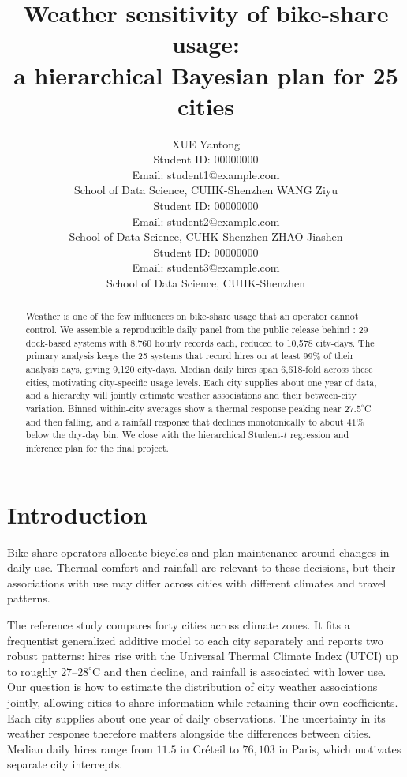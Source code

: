 \documentclass{article}
\title{Weather sensitivity of bike-share usage:\\ a hierarchical Bayesian plan for 25 cities}
\author{%
  XUE Yantong \\
  Student ID: 00000000 \\
  Email: student1@example.com \\
  School of Data Science, CUHK-Shenzhen
  \And
  WANG Ziyu \\
  Student ID: 00000000 \\
  Email: student2@example.com \\
  School of Data Science, CUHK-Shenzhen
  \And
  ZHAO Jiashen \\
  Student ID: 00000000 \\
  Email: student3@example.com \\
  School of Data Science, CUHK-Shenzhen
}
\begin{document}
\maketitle

\begin{abstract}
Weather is one of the few influences on bike-share usage that an operator cannot
control.
We assemble a reproducible daily panel from the public release behind
\citet{bean2021weather}: 29 dock-based systems with 8{,}760 hourly records each,
reduced to 10{,}578 city-days. The primary analysis keeps the 25 systems that
record hires on at least 99\% of their analysis days, giving 9{,}120 city-days.
Median daily hires span 6{,}618-fold across these cities, motivating city-specific
usage levels. Each city supplies about one year of data, and a hierarchy will
jointly estimate weather associations and their between-city variation. Binned
within-city averages show a thermal response
peaking near $27.5^\circ$C and then falling, and a rainfall response that
declines monotonically to about $41\%$ below the dry-day bin. We close with the
hierarchical Student-$t$ regression and inference plan for the final project.
\end{abstract}

\section{Introduction}

Bike-share operators allocate bicycles and plan maintenance around changes in
daily use. Thermal comfort and rainfall are relevant to these decisions, but
their associations with use may differ across cities with different climates
and travel patterns.

The reference study \citep{bean2021weather} compares forty cities across climate
zones. It fits a frequentist generalized additive model to each city separately
and reports two robust patterns: hires rise with the Universal Thermal Climate
Index (UTCI) up to roughly $27$--$28^\circ$C and then decline, and rainfall is
associated with lower use. Our question is how to estimate the distribution of
city weather associations jointly, allowing cities to share information while
retaining their own coefficients. Each city supplies about one year of daily
observations. The uncertainty in its weather response therefore matters alongside
the differences between cities. Median daily hires range from $11.5$ in
Cr{\'e}teil to $76{,}103$ in Paris, which motivates separate city intercepts.
\end{document}
